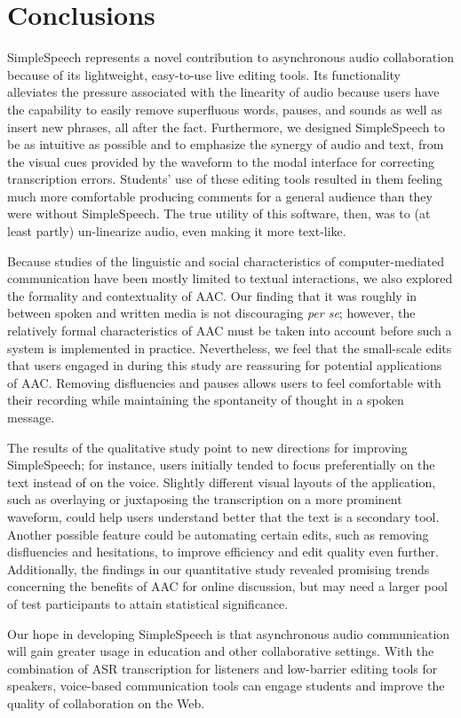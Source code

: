 \section{Conclusions}

SimpleSpeech represents a novel contribution to asynchronous audio collaboration because of its lightweight, easy-to-use live editing tools.
Its functionality alleviates the pressure associated with the linearity of audio because users have the capability to easily remove superfluous words, pauses, and sounds as well as insert new phrases, all after the fact.
Furthermore, we designed SimpleSpeech to be as intuitive as possible and to emphasize the synergy of audio and text, from the visual cues provided by the waveform to the modal interface for correcting transcription errors.
Students' use of these editing tools resulted in them feeling much more comfortable producing comments for a general audience than they were without SimpleSpeech.
The true utility of this software, then, was to (at least partly) un-linearize audio, even making it more text-like.

Because studies of the linguistic and social characteristics of computer-mediated communication have been mostly limited to textual interactions, we also explored the formality and contextuality of AAC. 
Our finding that it was roughly in between spoken and written media is not discouraging \textit{per se}; however, the relatively formal characteristics of AAC must be taken into account before such a system is implemented in practice.
Nevertheless, we feel that the small-scale edits that users engaged in during this study are reassuring for potential applications of AAC.
Removing disfluencies and pauses allows users to feel comfortable with their recording while maintaining the spontaneity of thought in a spoken message.

The results of the qualitative study point to new directions for improving SimpleSpeech; for instance, users initially tended to focus preferentially on the text instead of on the voice.
Slightly different visual layouts of the application, such as overlaying or juxtaposing the transcription on a more prominent waveform, could help users understand better that the text is a secondary tool.
Another possible feature could be automating certain edits, such as removing disfluencies and hesitations, to improve efficiency and edit quality even further.
Additionally, the findings in our quantitative study revealed promising trends concerning the benefits of AAC for online discussion, but may need a larger pool of test participants to attain statistical significance.

Our hope in developing SimpleSpeech is that asynchronous audio communication will gain greater usage in education and other collaborative settings. 
With the combination of ASR transcription for listeners and low-barrier editing tools for speakers, voice-based communication tools can engage students and improve the quality of collaboration on the Web.